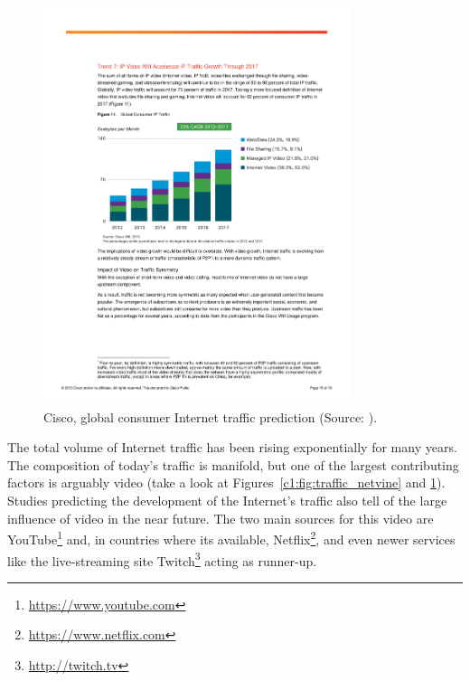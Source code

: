 \begin{figure}[htbp]
    \centering
    \includegraphics[width=0.8\textwidth]{images/VNI_Hyperconnectivity_WP.pdf}
    \caption{Cisco, global consumer Internet traffic prediction (Source: \cite{cisco2013VNI}).}
    \label{c1:fig:traffic_cisco}
\end{figure}

The total volume of Internet traffic has been rising exponentially for many years. The composition of today's traffic is manifold, but one of the largest contributing factors is arguably video (take a look at Figures~\ref{c1:fig:traffic_netvine} and \ref{c1:fig:traffic_cisco}). Studies predicting the development of the Internet's traffic also tell of the large influence of video in the near future. The two main sources for this video are YouTube\footnote{\url{https://www.youtube.com}} and, in countries where its available, Netflix\footnote{\url{https://www.netflix.com}}, and even newer services like the live-streaming site Twitch\footnote{\url{http://twitch.tv}} acting as runner-up.

